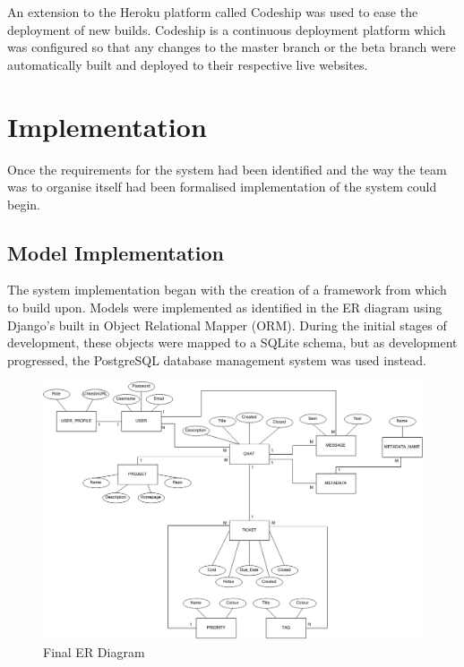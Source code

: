 \documentclass[a4paper]{l3proj}
\begin{document}
An extension to the Heroku platform called Codeship was used to ease the deployment of new builds. Codeship is a continuous deployment platform which was configured so that any changes to the master branch or the beta branch were automatically built and deployed to their respective live websites.


\chapter{Implementation}
\label{impl}

Once the requirements for the system had been identified and the way the team was to organise itself had been formalised implementation of the system could begin.


\section{Model Implementation}
\label{modelImpl}

The system implementation began with the creation of a framework from which to build upon.  Models were implemented as identified in the ER diagram using Django’s built in Object Relational Mapper (ORM). During the initial stages of development, these objects were mapped to a SQLite schema, but as development progressed, the PostgreSQL database management system was used instead.


\begin{figure}
\includegraphics[scale=0.35]{newERdiagram}
\caption{Final ER Diagram}
\end{figure}
\end{document}

